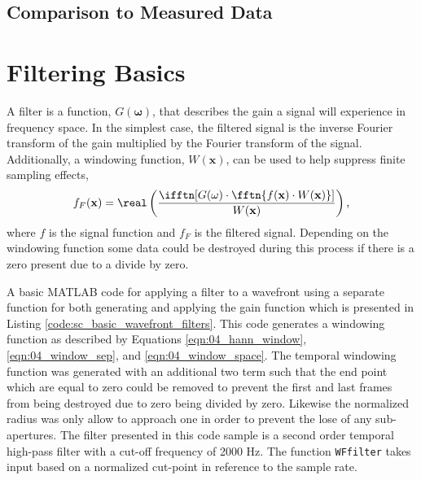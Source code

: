 \subsection{Comparison to Measured Data}

\section{Filtering Basics}
A filter is a function, $G(\mathbf{\omega})$, that describes the gain a signal will experience in frequency space.
In the simplest case, the filtered signal is the inverse Fourier transform of the gain multiplied by the Fourier transform of the signal.
Additionally, a windowing function, $W(\mathbf{x})$, can be used to help suppress finite sampling effects,
\begin{equation}
  f_F(\mathbf{x}) = \real\left(\frac{\ifftn[G(\mathbf{\omega})\cdot\fftn\{f(\mathbf{x})\cdot W(\mathbf{x})\}]}{W(\mathbf{x})}\right) \textrm{,}
  \label{eqn:04_filter_function}
\end{equation}
where $f$ is the signal function and $f_F$ is the filtered signal.
Depending on the windowing function some data could be destroyed during this process if there is a zero present due to a divide by zero.

A basic MATLAB code for applying a filter to a wavefront using a separate function for both generating and applying the gain function which is presented in Listing \ref{code:sc_basic_wavefront_filters}.
% 
This code generates a windowing function as described by Equations \ref{eqn:04_hann_window}, \ref{eqn:04_window_sep}, and \ref{eqn:04_window_space}.
The temporal windowing function was generated with an additional two term such that the end point which are equal to zero could be removed to prevent the first and last frames from being destroyed due to zero being divided by zero.
Likewise the normalized radius was only allow to approach one in order to prevent the lose of any sub-apertures.
The filter presented in this code sample is a second order temporal high-pass filter with a cut-off frequency of 2000 Hz.
The function \lstinline{WFfilter} takes input based on a normalized cut-point in reference to the sample rate.

